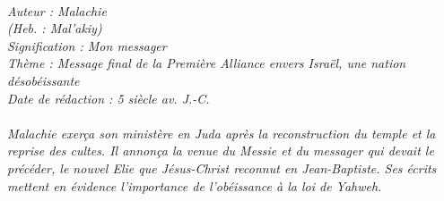 \BFont
\noindent\hrulefill
{\footnotesize
\textit{
\bigskip
{\centering{}
\\Auteur : Malachie
\\(Heb. : Mal'akiy)
\\Signification : Mon messager
\\Thème : Message final de la Première Alliance envers Israël, une nation désobéissante
\\Date de rédaction : 5 siècle av. J.-C.\\}
}
\textit{
\\Malachie exerça son ministère en Juda après la reconstruction du temple et la reprise des cultes. Il annonça la venue du Messie et du messager qui devait le précéder, le nouvel Elie que Jésus-Christ reconnut en Jean-Baptiste. Ses écrits mettent en évidence l'importance de l'obéissance à la loi de Yahweh.\bigskip
}
}
\par\nobreak\noindent\hrulefill
